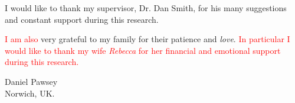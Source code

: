 
\def\baselinestretch{1.0}


I would like to thank my supervisor, Dr. Dan Smith, for his many suggestions and constant support during this research.

\noindent

\medskip

\noindent
\textcolor{red}{I am also} very grateful to my family for their patience and \emph{love}. \textcolor{red}{In particular I would like to thank my wife \emph{Rebecca} for her financial and emotional support during this research.}

\bigskip\medskip

\noindent
\hfill Daniel Pawsey \\
\hfill Norwich, UK.\\

